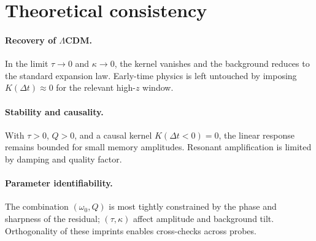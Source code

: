 \section{Theoretical consistency}
\label{sec:consistency}

\paragraph{Recovery of $\Lambda$CDM.} In the limit $\tau\!\to\!0$ and $\kappa\!\to\!0$, the kernel vanishes and the background reduces to the standard expansion law. Early-time physics is left untouched by imposing $K(\Delta t)\!\approx\!0$ for the relevant high-$z$ window.

\paragraph{Stability and causality.} With $\tau>0$, $Q>0$, and a causal kernel $K(\Delta t\!<\!0)=0$, the linear response remains bounded for small memory amplitudes. Resonant amplification is limited by damping and quality factor.

\paragraph{Parameter identifiability.} The combination $(\omega_0, Q)$ is most tightly constrained by the phase and sharpness of the residual; $(\tau,\kappa)$ affect amplitude and background tilt. Orthogonality of these imprints enables cross-checks across probes.

